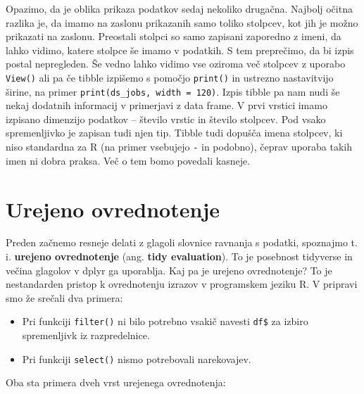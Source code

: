 \documentclass[
]{book}
\providecommand{\tightlist}{%
  \setlength{\itemsep}{0pt}\setlength{\parskip}{0pt}}
\begin{document}
Opazimo, da je oblika prikaza podatkov sedaj nekoliko drugačna. Najbolj očitna razlika je, da imamo na zaslonu prikazanih samo toliko stolpcev, kot jih je možno prikazati na zaslonu. Preostali stolpci so samo zapisani zaporedno z imeni, da lahko vidimo, katere stolpce še imamo v podatkih. S tem preprečimo, da bi izpis postal nepregleden. Še vedno lahko vidimo vse oziroma več stolpcev z uporabo \texttt{View()} ali pa če tibble izpišemo s pomočjo \texttt{print()} in ustrezno nastavitvijo širine, na primer \texttt{print(ds\_jobs,\ width\ =\ 120)}. Izpis tibble pa nam nudi še nekaj dodatnih informacij v primerjavi z data frame. V prvi vrstici imamo izpisano dimenzijo podatkov -- število vrstic in število stolpcev. Pod vsako spremenljivko je zapisan tudi njen tip. Tibble tudi dopušča imena stolpcev, ki niso standardna za R (na primer vsebujejo \texttt{-} in podobno), čeprav uporaba takih imen ni dobra praksa. Več o tem bomo povedali kasneje.

\hypertarget{urejeno-ovrednotenje}{%
\section{Urejeno ovrednotenje}\label{urejeno-ovrednotenje}}

Preden začnemo resneje delati z glagoli slovnice ravnanja s podatki, spoznajmo t. i. \textbf{urejeno ovrednotenje} (ang. \textbf{tidy evaluation}). To je posebnost tidyverse in večina glagolov v dplyr ga uporablja. Kaj pa je urejeno ovrednotenje? To je nestandarden pristop k ovrednotenju izrazov v programskem jeziku R. V pripravi smo že srečali dva primera:

\begin{itemize}
\tightlist
\item
  Pri funkciji \texttt{filter()} ni bilo potrebno vsakič navesti \texttt{df\$} za izbiro spremenljivk iz razpredelnice.
\item
  Pri funkciji \texttt{select()} nismo potrebovali narekovajev.
\end{itemize}

Oba sta primera dveh vrst urejenega ovrednotenja:
\end{document}
